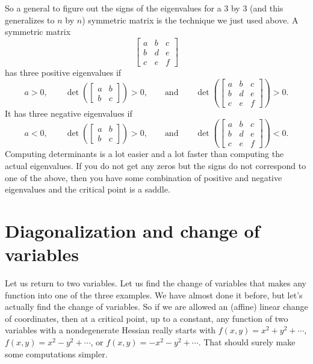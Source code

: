 \documentclass[12pt]{article}
\begin{document}
So a general to figure out the signs of the eigenvalues for
a 3 by 3 (and this generalizes to $n$ by $n$) symmetric matrix is
the technique we just used above.
A symmetric matrix
\begin{equation*}
\begin{bmatrix}
a & b & c \\
b & d & e \\
c & e & f
\end{bmatrix}
\end{equation*}
has 
three positive eigenvalues if
\begin{equation*}
a > 0,
\qquad
\det \left(
\begin{bmatrix}
a & b \\
b & c
\end{bmatrix}
\right) > 0 ,
\qquad \text{and} \qquad
\det \left(
\begin{bmatrix}
a & b & c \\
b & d & e \\
c & e & f
\end{bmatrix}
\right) > 0 .
\end{equation*}
It has three negative eigenvalues if
\begin{equation*}
a < 0,
\qquad
\det \left(
\begin{bmatrix}
a & b \\
b & c
\end{bmatrix}
\right) > 0 ,
\qquad \text{and} \qquad
\det \left(
\begin{bmatrix}
a & b & c \\
b & d & e \\
c & e & f
\end{bmatrix}
\right) < 0 .
\end{equation*}
Computing determinants is a lot easier and a lot faster than computing the
actual eigenvalues.
If you do not get any zeros but the signs do not correspond to one of the
above, then you have some combination of positive and negative eigenvalues
and the critical point is a saddle.

\section*{Diagonalization and change of variables}

Let us return to two variables.  Let us find the 
change of variables that makes any function into one of the three
examples.  We have almost done it before, but let's actually find
the change of variables.
So if we are allowed an (affine) linear change of coordinates, then at
a critical point, up to a constant, any
function of two variables with a nondegenerate Hessian really starts with
$f(x,y) = x^2+y^2 + \cdots$, 
$f(x,y) = x^2-y^2 + \cdots$, or
$f(x,y) = -x^2-y^2 + \cdots$.
That should surely make some computations simpler.
\end{document}
